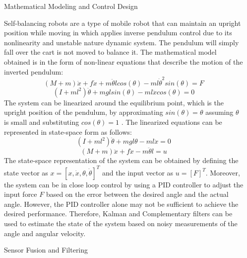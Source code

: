 \documentclass[final]{beamer}
\newlength{\sepwidth}
\newlength{\colwidth}
\newcommand{\separatorcolumn}{\begin{column}{\sepwidth}\end{column}}
\begin{document}
\begin{frame}[t]
\begin{columns}[t]
\separatorcolumn

\begin{column}{\colwidth}

  \begin{block}{Mathematical Modeling and Control Design}

   Self-balancing robots are a type of mobile robot that can maintain an upright position while moving in which applies inverse pendulum control due to its nonlinearity and unstable nature dynamic system. The pendulum will simply fall over the cart is not moved to balance it. The mathematical model obtained is in the form of non-linear equations that describe the motion of the inverted pendulum: 
   $$
   	(M + m)\ddot{x} + f\dot{x} + m\ddot{\theta}lcos(\theta) - ml\dot{\theta}^2sin(\theta) = F 
   $$
   $$
   	(I + ml^2)\ddot{\theta} + mglsin(\theta) - ml\ddot{x}cos(\theta) = 0
   $$
   The system can be linearized around the equilibrium point, which is the upright position of the pendulum, by approximating $sin(\theta) = \theta$ assuming $\theta$ is small and substituting $cos(\theta) = 1$ \cite{Abdelgawad2024-wr}. The linearized equations can be represented in state-space form as follows:
   $$
   	(I + ml^2)\ddot{\theta} + mgl\theta - ml\ddot{x} = 0
   $$
   $$
   	(M + m)\ddot{x} + f\dot{x} - m\ddot{\theta}l = u
   $$
   The state-space representation of the system can be obtained by defining the state vector as $x = [x, \dot{x}, \theta, \dot{\theta}]^T$ and the input vector as $u = [F]^T$. Moreover, the system can be in close loop control by using a PID controller to adjust the input force $F$ based on the error between the desired angle and the actual angle. However, the PID controller alone may not be sufficient to achieve the desired performance. Therefore, Kalman and Complementary filters can be used to estimate the state of the system based on noisy measurements of the angle and angular velocity. 
  \end{block}


  \vspace{0.8em}


  \begin{alertblock}{Sensor Fusion and Filtering}



\end{alertblock}
\end{column}
\end{columns}
\end{frame}
\end{document}
